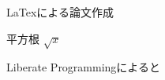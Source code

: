 \documentclass{jarticle}
\begin{document}
LaTexによる論文作成

平方根 $\sqrt{x}$

Liberate Programming\cite{Knuth84literateprogramming}によると


\end{document}
